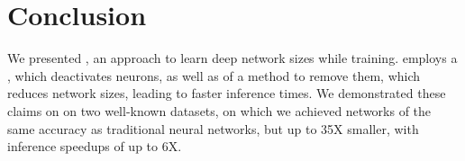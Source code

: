 \section{Conclusion}

We presented \shrink, an approach to learn deep network sizes while training.
\shrink employs a \swl, which deactivates neurons, as well as
of a method to remove them, which reduces network sizes, leading to faster
inference times. We demonstrated these claims on on two well-known datasets, on
which we achieved networks of the same accuracy as traditional neural
networks, but up to 35X smaller, with inference speedups of up
to 6X.

